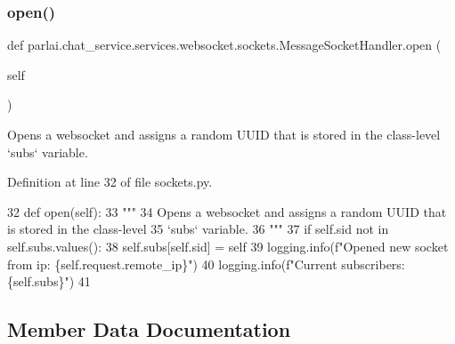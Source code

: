 \subsubsection{\texorpdfstring{open()}{open()}}
{\footnotesize\ttfamily def parlai.\+chat\+\_\+service.\+services.\+websocket.\+sockets.\+Message\+Socket\+Handler.\+open (\begin{DoxyParamCaption}\item[{}]{self }\end{DoxyParamCaption})}

\begin{DoxyVerb}Opens a websocket and assigns a random UUID that is stored in the class-level
`subs` variable.
\end{DoxyVerb}
 

Definition at line 32 of file sockets.\+py.


\begin{DoxyCode}
32     \textcolor{keyword}{def }open(self):
33         \textcolor{stringliteral}{"""}
34 \textcolor{stringliteral}{        Opens a websocket and assigns a random UUID that is stored in the class-level}
35 \textcolor{stringliteral}{        `subs` variable.}
36 \textcolor{stringliteral}{        """}
37         \textcolor{keywordflow}{if} self.sid \textcolor{keywordflow}{not} \textcolor{keywordflow}{in} self.subs.values():
38             self.subs[self.sid] = self
39             logging.info(f\textcolor{stringliteral}{"Opened new socket from ip: \{self.request.remote\_ip\}"})
40             logging.info(f\textcolor{stringliteral}{"Current subscribers: \{self.subs\}"})
41 
\end{DoxyCode}


\subsection{Member Data Documentation}
\mbox{\label{classparlai_1_1chat__service_1_1services_1_1websocket_1_1sockets_1_1MessageSocketHandler_ae97ee5ffb1b97863c68c32bbe89cde5e}} 
